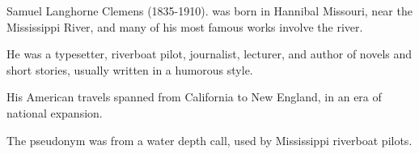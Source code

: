 \documentclass[../demo.tex]{novelettesubdoc}
\begin{document}
\begin{upperpage}
\null\null\null\null\null
{}
\null\null\null\null\null
\end{upperpage}

Samuel Langhorne Clemens (1835-1910).
was born in Hannibal Missouri, near the Mississippi River, and many of
his most famous works involve the river.

He was a typesetter, riverboat pilot, journalist, lecturer, and author of
novels and short stories, usually written in a humorous style.

His American travels spanned from California to New England, in an era of
national expansion.

The pseudonym  was from a water depth call, used by
Mississippi riverboat pilots.
\end{document}
